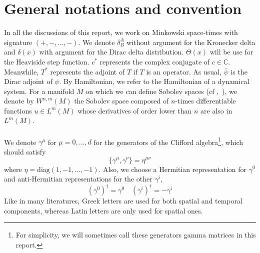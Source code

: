 \section*{General notations and convention}
In all the discussions of this report, we work on Minkowski space-times with signature $(+, -,\ldots, -)$.
We denote $\delta^A_B$ without argument for the Kronecker delta and $\delta(x)$ with argument for the Dirac delta distribution.
$\Theta(x)$ will be use for the Heaviside step function.
$c^*$ represents the complex conjugate of $c\in\mathbb{C}$. 
Meanwhile, $T^*$ represents the adjoint of $T$ if $T$ is an operator.
As usual, $\bar{\psi}$ is the Dirac adjoint of $\psi$.
By Hamiltonian, we refer to the Hamiltonian of a dynamical system.
For a manifold $M$ on which we can define Sobolev spaces (cf \eg\cite{Hebey1996},~\cite{Eichhorn1996}), 
we denote by $W^{n,m}(M)$ the Sobolev space composed of $n$-times differentiable functions $u\in L^m(M)$ whose derivatives of order lower than $n$ are also in $L^m(M)$.
\\\\
We denote $\gamma^\mu$ for $\mu = 0, \ldots, d$ for the generators of the Clifford algebra\footnote{
For simplicity, we will sometimes call these generators gamma matrices in this report.
}, which should satisfy
\begin{equation*}
\{ \gamma^\mu, \gamma^\nu \} = \eta^{\mu\nu}
\end{equation*} 
where $\eta = \mathrm{diag}(1, -1 ,\ldots, -1)$.
Also, we choose a Hermitian representation for $\gamma^0$ and anti-Hermitian representations for the other $\gamma^i$, 
\ie
\begin{equation*}
(\gamma^0)^\dagger = \gamma^0 \quad
(\gamma^i)^\dagger = -\gamma^i
\end{equation*}
Like in many literatures, Greek letters are used for both spatial and temporal components, whereas Latin letters are only used for spatial ones. \\